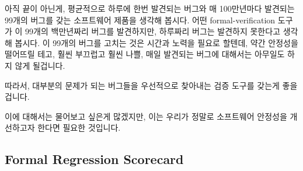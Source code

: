 아직 끝이 아닌게, 평균적으로 하루에 한번 발견되는 버그와 매 100만년마다
발견되는 99개의 버그를 갖는 소프트웨어 제품을 생각해 봅시다.
어떤 formal-verification 도구가 이 99개의 백만년짜리 버그를 발견하지만,
하루짜리 버그는 발견하지 못한다고 생각해 봅시다.
이 99개의 버그를 고치는 것은 시간과 노력을 필요로 할텐데, 약간 안정성을
떨어뜨릴 테고, 훨씬 부끄럽고 훨씬 나쁠, 매일 발견되는 버그에 대해서는 아무일도
하지 않게 될겁니다.

따라서, 대부분의 문제가 되는 버그들을 우선적으로 찾아내는 검증 도구를 갖는게
좋을 겁니다.

이에 대해서는 물어보고 싶은게 많겠지만, 이는 우리가 정말로 소프트웨어 안정성을
개선하고자 한다면 필요한 것입니다.
\iffalse

Worse yet, imagine another software artifact with one bug that fails
once every day on average and 99 more that fail every million years
each.
Suppose that a formal-verification tool located the 99 million-year
bugs, but failed to find the one-day bug.
Fixing the 99 bugs located will take time and effort, likely slightly
decrease reliability, and do nothing at all about the pressing
each-day failure that is likely causing much embarrassment and perhaps
much worse besides.

Therefore, it would be best to have a validation tool that
preferentially located the most troublesome bugs.

This might sound like too much to ask, but it is what is really
required if we are to actually increase software reliability.
\fi

\subsection{Formal Regression Scorecard}
\label{sec:future:Formal Regression Scorecard}

